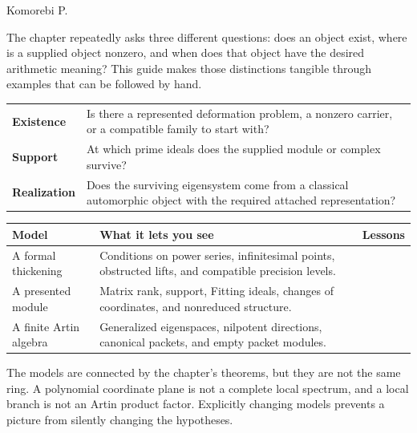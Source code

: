 {\sffamily\small Komorebi P.}\par
The chapter repeatedly asks three different questions: does an object exist, where is a supplied object nonzero, and when does that object have the desired arithmetic meaning? This guide makes those distinctions tangible through examples that can be followed by hand.

\begin{insight}
\begin{tabularx}{\linewidth}{@{}p{.18\linewidth}Y@{}}
\textbf{Existence} & Is there a represented deformation problem, a nonzero carrier, or a compatible family to start with?\\[3pt]
\textbf{Support} & At which prime ideals does the supplied module or complex survive?\\[3pt]
\textbf{Realization} & Does the surviving eigensystem come from a classical automorphic object with the required attached representation?
\end{tabularx}
\end{insight}

\begin{tabularx}{\linewidth}{@{}p{.20\linewidth}Y>{\raggedright\arraybackslash}p{.15\linewidth}@{}}\toprule
\textbf{Model} & \textbf{What it lets you see} & \textbf{Lessons}\\\midrule
A formal thickening & Conditions on power series, infinitesimal points, obstructed lifts, and compatible precision levels. & \\
A presented module & Matrix rank, support, Fitting ideals, changes of coordinates, and nonreduced structure. & \\
A finite Artin algebra & Generalized eigenspaces, nilpotent directions, canonical packets, and empty packet modules. & \\\bottomrule
\end{tabularx}

The models are connected by the chapter's theorems, but they are not the same ring. A polynomial coordinate plane is not a complete local spectrum, and a local branch is not an Artin product factor. Explicitly changing models prevents a picture from silently changing the hypotheses.

